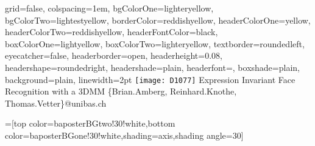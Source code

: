 \documentclass[portrait,final,a0paper]{baposter}
\begin{document}
\newlength{\leftimgwidth}
\begin{poster}%
  {
  grid=false,
  colspacing=1em,
  bgColorOne=lighteryellow,
  bgColorTwo=lightestyellow,
  borderColor=reddishyellow,
  headerColorOne=yellow,
  headerColorTwo=reddishyellow,
  headerFontColor=black,
  boxColorOne=lightyellow,
  boxColorTwo=lighteryellow,
  textborder=roundedleft,
  eyecatcher=false,
  headerborder=open,
  headerheight=0.08\textheight,
  headershape=roundedright,
  headershade=plain,
  headerfont=\Large\textsf, %
  boxshade=plain,
  background=plain,
  linewidth=2pt
  }
  {\texttt{[image: D1077]}} %
  {\sf %
  Expression Invariant Face Recognition with a 3DMM}
  {\sf %
  \vspace{1em}\{Brian.Amberg, Reinhard.Knothe, Thomas.Vetter\}@unibas.ch
  }
  {%
  }

  =[top color=baposterBGtwo!30!white,bottom color=baposterBGone!30!white,shading=axis,shading angle=30]

     \setlength{\leftimgwidth}{0.78em+8.0em}

    \newcommand{\colouredcircle}[1]{%
      \tikz{\useasboundingbox (-0.2em,-0.32em) rectangle(0.2em,0.32em); \draw[draw=black,fill=baposterBGone!80!black!#1!white,line width=0.03em] (0,0) circle(0.18em);}}


\end{poster}
\end{document}
